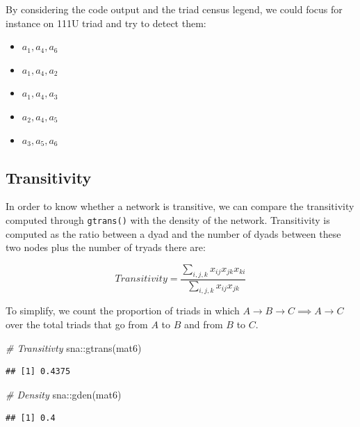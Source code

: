 \documentclass[
  notitlepage,
  onecolumn,
  openany]{book}
\newenvironment{Shaded}{\begin{snugshade}}{\end{snugshade}}
\newcommand{\CommentTok}[1]{\textcolor[rgb]{0.56,0.35,0.01}{\textit{#1}}}
\newcommand{\FunctionTok}[1]{\textcolor[rgb]{0.00,0.00,0.00}{#1}}
\newcommand{\NormalTok}[1]{#1}
\newcommand{\SpecialCharTok}[1]{\textcolor[rgb]{0.00,0.00,0.00}{#1}}
\providecommand{\tightlist}{%
  \setlength{\itemsep}{0pt}\setlength{\parskip}{0pt}}
\begin{document}
By considering the code output and the triad census legend, we could focus for instance on 111U triad and try to detect them:

\begin{itemize}
\tightlist
\item
  \(a_1, a_4, a_6\)
\item
  \(a_1, a_4, a_2\)
\item
  \(a_1, a_4, a_3\)
\item
  \(a_2, a_4, a_5\)
\item
  \(a_3, a_5, a_6\)
\end{itemize}

\hypertarget{transitivity}{%
\subsection{Transitivity}\label{transitivity}}

In order to know whether a network is transitive, we can compare the transitivity computed through \texttt{gtrans()} with the density of the network. Transitivity is computed as the ratio between a dyad and the number of dyads between these two nodes plus the number of tryads there are:

\[
Transitivity = \frac{\sum_{i,j,k}x_{ij}x_{jk}x_{ki}}{\sum_{i,j,k}x_{ij}x_{jk}}
\]

To simplify, we count the proportion of triads in which \(A \rightarrow B \rightarrow C \implies A\rightarrow C\) over the total triads that go from \(A\) to \(B\) and from \(B\) to \(C\).

\begin{Shaded}
\begin{Highlighting}[]
\CommentTok{\# Transitivty}
\NormalTok{sna}\SpecialCharTok{::}\FunctionTok{gtrans}\NormalTok{(mat6)}
\end{Highlighting}
\end{Shaded}

\begin{verbatim}
## [1] 0.4375
\end{verbatim}

\begin{Shaded}
\begin{Highlighting}[]
\CommentTok{\# Density}
\NormalTok{sna}\SpecialCharTok{::}\FunctionTok{gden}\NormalTok{(mat6)}
\end{Highlighting}
\end{Shaded}

\begin{verbatim}
## [1] 0.4
\end{verbatim}
\end{document}
